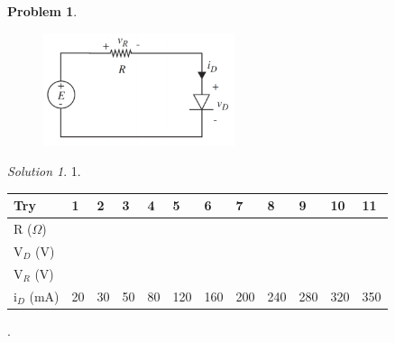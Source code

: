 \documentclass[11pt,a4paper,notitlepage]{article}
\theoremstyle{plain}
\newtheorem{problem}{Problem}[section]
\theoremstyle{remark}
\newtheorem*{solution}{Solution}
\begin{document}
{{{\begin{problem}
		\begin{figure}[h!]
			\centering
			\includegraphics[width=0.5\textwidth]{images/circuit1.png}
		\end{figure}
	\end{problem}
	
	\begin{solution}
		1.
		\begin{table}[h]
			\begin{tabular}{| l | l | l | l | l | l | l | l | l | l | l | l |}
				\hline
				Try          & 1 & 2 & 3 & 4 & 5 & 6 & 7 & 8 & 9 & 10 & 11 \\ \hline
				R (\(\Omega\))   &   &   &   &   &   &   &   &   &   &    &    \\ \hline
				V$_{D}$ (V)  &   &   &   &   &   &   &   &   &   &    &    \\ \hline
				V$_{R}$ (V)  &   &   &   &   &   &   &   &   &   &    &    \\ \hline
				i$_{D}$ (mA) & 20 & 30 & 50 & 80 & 120 & 160 & 200 & 240 & 280 & 320 & 350 \\ \hline
			\end{tabular}
		\end{table}
		.
	\end{solution}
	
}}}
\end{document}
